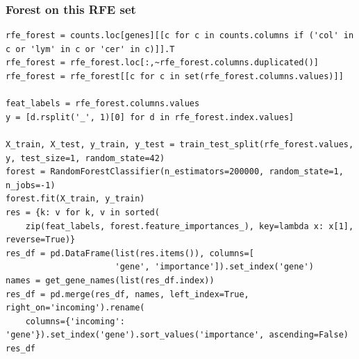 \documentclass[11pt]{article}
\begin{document}
\subsubsection{Forest on this RFE set}
\label{sec:org7ad30ee}

\begin{verbatim}
rfe_forest = counts.loc[genes][[c for c in counts.columns if ('col' in c or 'lym' in c or 'cer' in c)]].T
rfe_forest = rfe_forest.loc[:,~rfe_forest.columns.duplicated()]
rfe_forest = rfe_forest[[c for c in set(rfe_forest.columns.values)]]

feat_labels = rfe_forest.columns.values
y = [d.rsplit('_', 1)[0] for d in rfe_forest.index.values]

X_train, X_test, y_train, y_test = train_test_split(rfe_forest.values, y, test_size=1, random_state=42)
forest = RandomForestClassifier(n_estimators=200000, random_state=1, n_jobs=-1)
forest.fit(X_train, y_train)
res = {k: v for k, v in sorted(
    zip(feat_labels, forest.feature_importances_), key=lambda x: x[1], reverse=True)}
res_df = pd.DataFrame(list(res.items()), columns=[
                      'gene', 'importance']).set_index('gene')
names = get_gene_names(list(res_df.index))
res_df = pd.merge(res_df, names, left_index=True, right_on='incoming').rename(
    columns={'incoming': 'gene'}).set_index('gene').sort_values('importance', ascending=False)
res_df
\end{verbatim}
\end{document}
